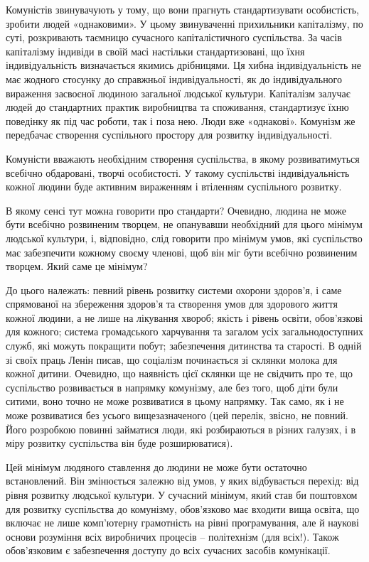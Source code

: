 \documentclass[../main]{subfiles}
\begin{document}
Комуністів звинувачують у тому, що вони прагнуть стандартизувати особистість, зробити людей «однаковими». У цьому звинуваченні прихильники капіталізму, по суті, розкривають таємницю сучасного капіталістичного суспільства. За часів капіталізму індивіди в своїй масі настільки стандартизовані, що їхня індивідуальність визначається якимись дрібницями. Ця хибна індивідуальність не має жодного стосунку до справжньої індивідуальності, як до індивідуального вираження засвоєної людиною загальної людської культури. Капіталізм залучає людей до стандартних практик виробництва та споживання, стандартизує їхню поведінку як під час роботи, так і поза нею. Люди вже «однакові». Комунізм же передбачає створення суспільного простору для розвитку індивідуальності.

Комуністи вважають необхідним створення суспільства, в якому розвиватимуться всебічно обдаровані, творчі особистості. У такому суспільстві індивідуальність кожної людини буде активним вираженням і втіленням суспільного розвитку.

В якому сенсі тут можна говорити про стандарти? Очевидно, людина не може бути всебічно розвиненим творцем, не опанувавши необхідний для цього мінімум людської культури, і, відповідно, слід говорити про мінімум умов, які суспільство має забезпечити кожному своєму членові, щоб він міг бути всебічно розвиненим творцем. Який саме це мінімум?

До цього належать: певний рівень розвитку системи охорони здоров’я, і саме спрямованої на збереження здоров’я та створення умов для здорового життя кожної людини, а не лише на лікування хвороб; якість і рівень освіти, обов’язкові для кожного; система громадського харчування та загалом усіх загальнодоступних служб, які можуть покращити побут; забезпечення дитинства та старості. В одній зі своїх праць Ленін писав, що соціалізм починається зі склянки молока для кожної дитини. Очевидно, що наявність цієї склянки ще не свідчить про те, що суспільство розвивається в напрямку комунізму, але без того, щоб діти були ситими, воно точно не може розвиватися в цьому напрямку. Так само, як і не може розвиватися без усього вищезазначеного (цей перелік, звісно, не повний. Його розробкою повинні займатися люди, які розбираються в різних галузях, і в міру розвитку суспільства він буде розширюватися).

Цей мінімум людяного ставлення до людини не може бути остаточно встановлений. Він змінюється залежно від умов, у яких відбувається перехід: від рівня розвитку людської культури. У сучасний мінімум, який став би поштовхом для розвитку суспільства до комунізму, обов’язково має входити вища освіта, що включає не лише комп’ютерну грамотність на рівні програмування, але й наукові основи розуміння всіх виробничих процесів – політехнізм (для всіх!). Також обов’язковим є забезпечення доступу до всіх сучасних засобів комунікації.
\end{document}
